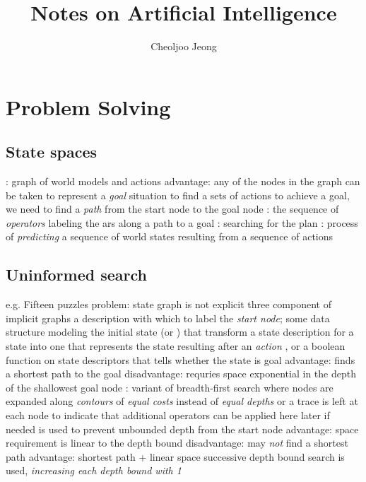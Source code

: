 \documentclass{note}
\begin{document}
\title{Notes on Artificial Intelligence}
\author{Cheoljoo Jeong}
\maketitle

\section{Problem Solving}
\subsection{State spaces}
\bit
\w {}: graph of world models and actions
	\bit
	\w advantage: any of the nodes in the graph can be 
		taken to represent a {\em goal\/} situation
	\w to find a sets of actions to achieve a goal, 
		we need to find a {\em path\/} from the start
		node to the goal node
	\w {}: the sequence of {\em operators\/} 
		labeling the ars along a path
		to a goal 
	\w {}: searching for the plan
	\w {}: process of {\em predicting\/} a sequence
		of world states resulting from a sequence of actions
	\eit
\eit

\subsection{Uninformed search}
\bit
\w {}
	\bit
	\w e.g. Fifteen puzzles problem: state graph is not explicit
	\w three component of implicit graphs
		\ben
		\w a description with which to label the {\em start node\/};
		some data structure modeling the initial state
		 (or )
			that transform a state description for a state
			into one that represents the state resulting
			after an {\em action\/}
		, or a boolean function 
			on state descriptors that tells whether the
			state is goal
		\een
	\eit
\w {}
	\bit
	\w advantage: finds a shortest path to the goal
	\w disadvantage: requries space exponential in the depth of the 
		shallowest goal node
	\w {}: variant of breadth-first search
		where nodes are expanded along {\em contours\/} of
		{\em equal costs\/} instead of {\em equal depths\/}
	\eit
\w {} or 
	\bit
	\w a trace is left at each node to indicate
		that additional operators can be applied here later
		if needed
	\w {} is used to prevent unbounded depth from
		the start node
	\w {}
	\w advantage: space requirement is linear to the depth bound
	\w disadvantage: may {\em not\/} find a shortest path
	\eit
\w {}
	\bit
	\w advantage: shortest path + linear space
	\w successive depth bound search is used, {\em increasing
		each depth bound with 1}
	\w 
	\eit
\eit
\end{document}

